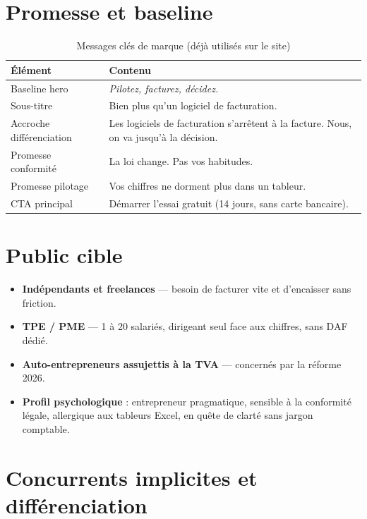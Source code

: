 \documentclass[11pt,a4paper]{report}
\begin{document}
\section{Promesse et baseline}

\begin{table}[h]
\centering
\caption{Messages clés de marque (déjà utilisés sur le site)}
\begin{tabular}{@{}p{3.2cm}p{10.5cm}@{}}
\toprule
\textbf{Élément} & \textbf{Contenu} \\
\midrule
Baseline hero & \emph{Pilotez, facturez, décidez.} \\
Sous-titre & Bien plus qu'un logiciel de facturation. \\
Accroche différenciation & Les logiciels de facturation s'arrêtent à la facture. Nous, on va jusqu'à la décision. \\
Promesse conformité & La loi change. Pas vos habitudes. \\
Promesse pilotage & Vos chiffres ne dorment plus dans un tableur. \\
CTA principal & Démarrer l'essai gratuit (14 jours, sans carte bancaire). \\
\bottomrule
\end{tabular}
\end{table}

\section{Public cible}

\begin{itemize}[leftmargin=*]
    \item \textbf{Indépendants et freelances} — besoin de facturer vite et d'encaisser sans friction.
    \item \textbf{TPE / PME} — 1 à 20 salariés, dirigeant seul face aux chiffres, sans DAF dédié.
    \item \textbf{Auto-entrepreneurs assujettis à la TVA} — concernés par la réforme 2026.
    \item \textbf{Profil psychologique} : entrepreneur pragmatique, sensible à la conformité légale,
    allergique aux tableurs Excel, en quête de clarté sans jargon comptable.
\end{itemize}

\section{Concurrents implicites et différenciation}
\end{document}
